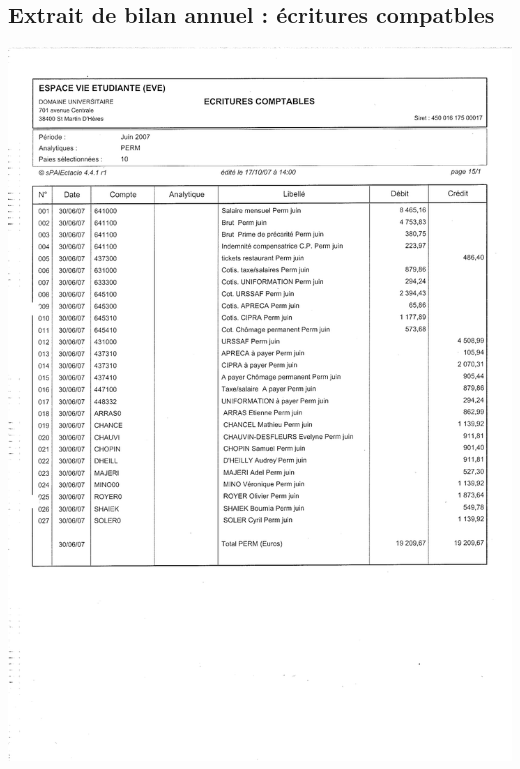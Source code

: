 \subsection{Extrait de bilan annuel : écritures compatbles}
\begin{center}
\includegraphics[scale=0.8]{annexes/images/bilan_annuel_ecritures_comptables.pdf}
\end{center}
